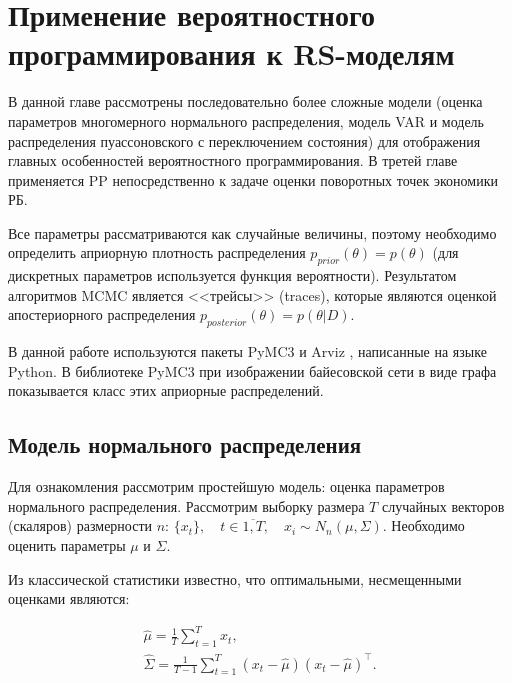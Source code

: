 \documentclass[a4paper,14pt]{extreport}
\begin{document}
\section{Применение вероятностного программирования к RS-моделям}

В данной главе рассмотрены последовательно более сложные модели (оценка параметров многомерного нормального распределения, модель VAR и модель распределения пуассоновского с переключением состояния) для отображения главных особенностей вероятностного программирования. В третей главе применяется PP непосредственно к задаче оценки поворотных точек экономики РБ.

Все параметры рассматриваются как случайные величины, поэтому необходимо определить априорную плотность распределения $p_{prior}(\theta) = p(\theta)$ (для дискретных параметров используется функция вероятности). Результатом алгоритмов MCMC является <<трейсы>> (traces), которые являются оценкой апостериорного распределения $p_{posterior}(\theta) = p(\theta|D)$.

В данной работе используются пакеты PyMC3 \cite{pymc3_2016} и Arviz \cite{arviz_2019}, написанные на языке Python. В библиотеке PyMC3 при изображении байесовской сети в виде графа показывается класс этих априорные распределений.


\subsection{Модель нормального распределения}

\label{subsection:mvn}

Для ознакомления рассмотрим простейшую модель: оценка параметров нормального распределения. Рассмотрим выборку размера $T$ случайных векторов (скаляров) размерности $n$: $\{x_t\}, \quad t\in\overline{1,T}, \quad x_i \sim N_n(\mu, \Sigma)$. Необходимо оценить параметры $\mu$ и $\Sigma$. 

Из классической статистики известно, что оптимальными, несмещенными оценками являются:

\begin{equation}
	\begin{multlined}
		\hat{\mu}=\frac{1}{T}\sum\limits_{t=1}^{T}{x_t}, \\
		\hat{\Sigma}=\frac{1}{T-1}\sum\limits_{t=1}^{T}{(x_t-\hat{\mu})(x_t-\hat{\mu})^\top} . 
	\end{multlined}
\end{equation}
\end{document}
